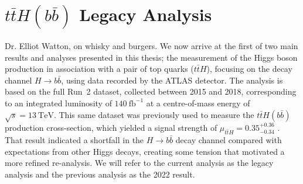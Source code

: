 \chapter{$t\bar{t}H(b\bar{b})$ Legacy Analysis}
\label{chap::tth}
%
{Dr. Elliot Watton, on whisky and burgers.}
We now arrive at the first of two main results and analyses presented in this thesis; the measurement of the Higgs boson production in association with a pair of top quarks ($t\bar{t}H$), focusing on the decay channel $H \to b\bar{b}$, using data recorded by the ATLAS detector. The analysis is based on the full Run~2 dataset, collected between 2015 and 2018, corresponding to an integrated luminosity of $140~\text{fb}^{-1}$ at a centre-of-mass energy of $\sqrt{s} = 13~\text{TeV}$. This same dataset was previously used to measure the $t\bar{t}H(b\bar{b})$ production cross-section, which yielded a signal strength of $\mu_{t\bar{t}H} = 0.35^{+0.36}_{-0.34}$ \cite{tth-atlas-2018}. That result indicated a shortfall in the $H \to b\bar{b}$ decay channel compared with expectations from other Higgs decays, creating some tension that motivated a more refined re-analysis. We will refer to the current analysis as the legacy analysis and the previous analysis as the 2022 result.
